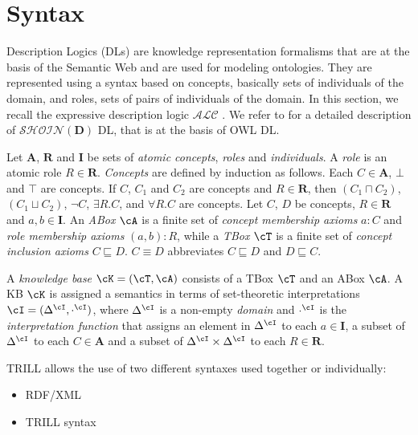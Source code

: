\section{Syntax}
\label{syn}

Description Logics (DLs) are knowledge representation formalisms that are at the basis of the Semantic Web \cite{DBLP:conf/dlog/2003handbook,dlchap} and are used for modeling ontologies.
They are represented using a syntax based on concepts, basically sets of individuals of the domain, and roles, sets of pairs of individuals
of the domain. In this section, we recall the expressive description logic $\mathcal{ALC}$ \cite{DBLP:journals/ai/Schmidt-SchaussS91}. We refer to 
\cite{DBLP:journals/ws/LukasiewiczS08} for a detailed description of $\mathcal{SHOIN}(\mathbf{D})$ DL, that is at the basis of OWL DL.

Let $\mathbf{A}$, $\mathbf{R}$ and $\mathbf{I}$ be sets of \emph{atomic concepts}, \emph{roles} and \emph{individuals}.
A \emph{role} is an atomic role $R \in \mathbf{R}$. 
\emph{Concepts} are defined by induction as follows. Each $C \in \mathbf{A}$, $\bot$ and $\top$
are concepts.
If $C$, $C_1$ and $C_2$ are concepts and $R \in \mathbf{R}$, then $(C_1\sqcap C_2)$, $(C_1\sqcup C_2 )$, $\neg C$,
$\exists R.C$, and $\forall R.C$ are concepts. 
Let $C$, $D$ be concepts,  $R \in \mathbf{R}$ and $a, b \in \mathbf{I}$. 
An \emph{ABox} $\cA$ is a finite set of \textit{concept membership axioms} $a : C$ and \textit{role membership
axioms} $(a, b) : R$, while 
a \emph{TBox} $\cT$ is a finite set of \textit{concept inclusion axioms} $C\sqsubseteq D$. $C \equiv D$ abbreviates $C \sqsubseteq D$ and $D\sqsubseteq  C$.

A \emph{knowledge base} $\cK = (\cT, \cA)$ consists of a TBox $\cT$ and an ABox $\cA$.
A KB $\cK$ is assigned a semantics in terms of set-theoretic interpretations $\cI = (\Delta^\cI , \cdot^\cI )$, where $\Delta^\cI$ is a non-empty \textit{domain} and $\cdot^\cI$ is the \textit{interpretation function} that assigns  an element in $\Delta ^\cI$ to each $a \in \mathbf{I}$, a subset of $\Delta^\cI$ to each $C \in \mathbf{A}$ and a subset of $\Delta^\cI \times \Delta^\cI$ to each $R \in \mathbf{R}$.

TRILL allows the use of two different syntaxes used together or individually:
\begin{itemize}
 \item RDF/XML
 \item TRILL syntax 
\end{itemize}

